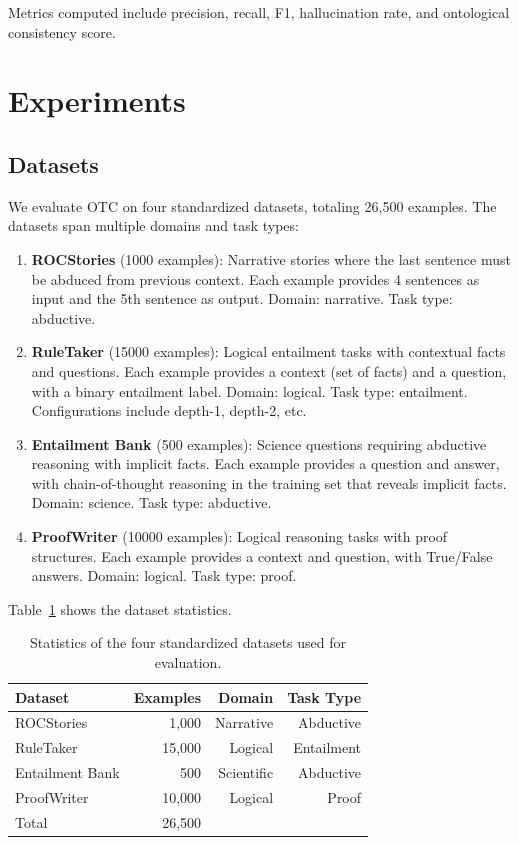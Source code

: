 \documentclass[11pt,letterpaper]{article}
\begin{document}
Metrics computed include precision, recall, F1, hallucination rate, and ontological consistency score.

\section{Experiments}

\subsection{Datasets}

We evaluate OTC on four standardized datasets, totaling 26,500 examples. The datasets span multiple domains and task types:

\begin{enumerate}
  \item \textbf{ROCStories} (1000 examples): Narrative stories where the last sentence must be abduced from previous context. Each example provides 4 sentences as input and the 5th sentence as output. Domain: narrative. Task type: abductive.

  \item \textbf{RuleTaker} (15000 examples): Logical entailment tasks with contextual facts and questions. Each example provides a context (set of facts) and a question, with a binary entailment label. Domain: logical. Task type: entailment. Configurations include depth-1, depth-2, etc.

  \item \textbf{Entailment Bank} (500 examples): Science questions requiring abductive reasoning with implicit facts. Each example provides a question and answer, with chain-of-thought reasoning in the training set that reveals implicit facts. Domain: science. Task type: abductive.

  \item \textbf{ProofWriter} (10000 examples): Logical reasoning tasks with proof structures. Each example provides a context and question, with True/False answers. Domain: logical. Task type: proof.
\end{enumerate}

Table~\ref{tab:datasets} shows the dataset statistics.

\begin{table}[!htbp]
  \centering
  \caption{Statistics of the four standardized datasets used for evaluation.}
  \label{tab:datasets}
  \begin{tabular}{lrrr}
    \toprule
    Dataset & Examples & Domain & Task Type \\
    \midrule
    ROCStories & 1,000 & Narrative & Abductive \\
    RuleTaker & 15,000 & Logical & Entailment \\
    Entailment Bank & 500 & Scientific & Abductive \\
    ProofWriter & 10,000 & Logical & Proof \\
    \midrule
    Total & 26,500 & & \\
    \bottomrule
  \end{tabular}
\end{table}
\end{document}
